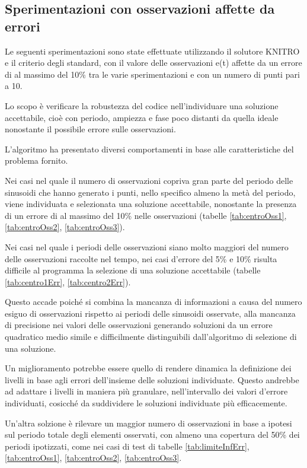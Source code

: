 \documentclass[a4paper,12pt]{report}
\begin{document}
\subsection{Sperimentazioni con osservazioni affette da errori}
Le seguenti sperimentazioni sono state effettuate utilizzando il solutore KNITRO e il criterio degli standard, con il valore delle osservazioni e(t) affette da un errore di al massimo del 10\% tra le varie sperimentazioni e con un numero di punti pari a 10.

Lo scopo è verificare la robustezza del codice nell'individuare una soluzione accettabile, cioè con periodo, ampiezza e fase poco distanti da quella ideale nonostante il possibile errore sulle osservazioni.

L'algoritmo ha presentato diversi comportamenti in base alle caratteristiche del problema fornito.

Nei casi nel quale il numero di osservazioni copriva gran parte del periodo delle sinusoidi che hanno generato i punti, nello specifico almeno la metà del periodo, viene individuata e selezionata una soluzione accettabile, nonostante la presenza di un errore di al massimo del 10\% nelle osservazioni (tabelle \ref{tab:entroOss1}, \ref{tab:entroOss2}, \ref{tab:entroOss3}).

Nei casi nel quale i periodi delle osservazioni siano molto maggiori del numero delle osservazioni raccolte nel tempo, nei casi d'errore del 5\% e 10\% risulta difficile al programma la selezione di una soluzione accettabile
(tabelle \ref{tab:centro1Err}, \ref{tab:centro2Err}).

Questo accade poiché si combina la mancanza di informazioni a causa del numero esiguo di osservazioni rispetto ai periodi delle sinusoidi osservate, alla mancanza di precisione nei valori delle osservazioni generando soluzioni da un errore quadratico medio simile e difficilmente distinguibili dall'algoritmo di selezione di una soluzione.

Un miglioramento potrebbe essere quello di rendere dinamica la definizione dei livelli in base agli errori dell'insieme delle soluzioni individuate. Questo andrebbe ad adattare i livelli in maniera più granulare, nell'intervallo dei valori d'errore individuati, cosicché da suddividere le soluzioni individuate più efficacemente.

Un'altra solzione è rilevare un maggior numero di osservazioni in base a ipotesi sul periodo totale degli elementi osservati, con almeno una copertura del 50\% dei periodi ipotizzati, come nei casi di test di tabelle \ref{tab:limiteInfErr}, \ref{tab:entroOss1}, \ref{tab:entroOss2}, \ref{tab:entroOss3}.
\end{document}
